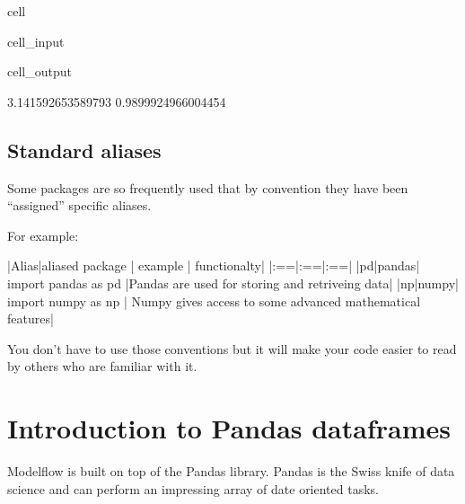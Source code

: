 \documentclass[letterpaper,10pt,english]{jupyterBook}
\begin{document}
\begin{sphinxuseclass}{cell}\begin{sphinxVerbatimInput}

\begin{sphinxuseclass}{cell_input}
\begin{sphinxVerbatim}[commandchars=\\\{\}]
   
\end{sphinxVerbatim}

\end{sphinxuseclass}\end{sphinxVerbatimInput}
\begin{sphinxVerbatimOutput}

\begin{sphinxuseclass}{cell_output}
\begin{sphinxVerbatim}[commandchars=\\\{\}]
3.141592653589793
\PYGZhy{}0.9899924966004454
\end{sphinxVerbatim}

\end{sphinxuseclass}\end{sphinxVerbatimOutput}

\end{sphinxuseclass}

\subsection{Standard aliases}
\label{\detokenize{content/04_PythonEssentials/PythonPackagesEtc:standard-aliases}}
\sphinxAtStartPar
Some packages are so frequently used that by convention they have been “assigned” specific aliases.

\sphinxAtStartPar
For example:

\sphinxAtStartPar
{}
|Alias|aliased package | example | functionalty|
|:==|:==|:==|
|pd|pandas| import pandas as pd |Pandas are used for storing and retriveing data|
|np|numpy| import numpy as np | Numpy gives access to some advanced mathematical features|

\sphinxAtStartPar
You don’t have to use those conventions but it will make your code easier to read by others who are familiar with it.


\section{Introduction to Pandas dataframes}
\label{\detokenize{content/04_PythonEssentials/PythonPackagesEtc:introduction-to-pandas-dataframes}}
\sphinxAtStartPar
Modelflow is built on top of the Pandas library. Pandas is the Swiss knife of data science and can perform an impressing array of date oriented tasks.
\end{document}
